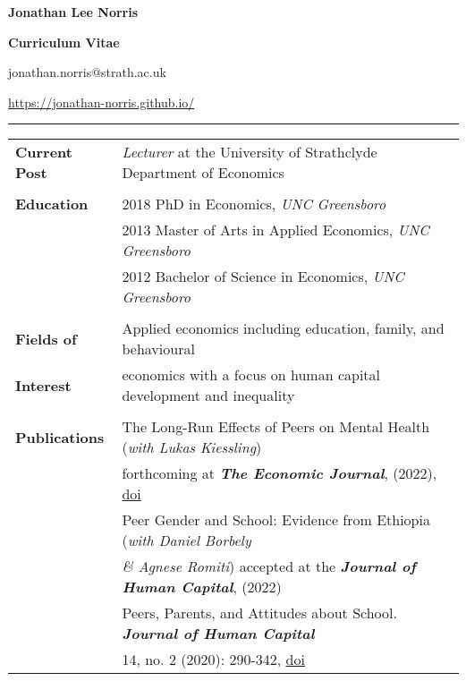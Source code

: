 \documentclass[11pt,a4paper]{article}
\begin{document}
	
\begin{center}

\textsf{{\Large\textbf{Jonathan Lee Norris}}}		
\smallskip	
	
\textsf{{\Large \textbf{Curriculum Vitae}}} 
\smallskip
	
\textsf{jonathan.norris@strath.ac.uk}

\textsf{\url{https://jonathan-norris.github.io/}}	
\end{center}	
	\hrule height 1pt

\bigskip

\begin{longtable}{l l}
\textbf{Current Post}  &  \textit{Lecturer} at the University of Strathclyde Department of Economics  \\
                                       &  \\
\textbf{Education}      &   2018 PhD in Economics, \textit{UNC Greensboro}	  \\
																			 &   2013 Master of Arts in Applied Economics, \textit{UNC Greensboro}    \\
																			 &   2012 Bachelor of Science in Economics, \textit{UNC Greensboro}	   \\
																			 &   \\ 
\textbf{Fields of}         &   Applied economics including education, family, and behavioural   \\ 
\textbf{Interest}           &   economics with a focus on human capital development and inequality \\ 
																			 &   \\
\textbf{Publications}   &  The Long-Run Effects of Peers on Mental Health (\textit{with Lukas Kiessling})     \\
																				&  forthcoming at \textbf{\textit{The Economic Journal}}, (2022), \href{https://doi.org/10.1093/ej/ueac039}{doi}  \\ 
\addlinespace
																				&  Peer Gender and School: Evidence from Ethiopia (\textit{with Daniel Borbely}    \\ 
																				&  \textit{\& Agnese Romiti}) accepted at the \textbf{\textit{Journal of Human Capital}}, (2022)    \\ 
\addlinespace
																				&  Peers, Parents, and Attitudes about School. \textbf{\textit{Journal of Human Capital}}  \\
																				&  14, no. 2 (2020): 290-342, \href{https://doi.org/10.1086/709507}{doi}  \\   

\end{longtable}
\end{document}

